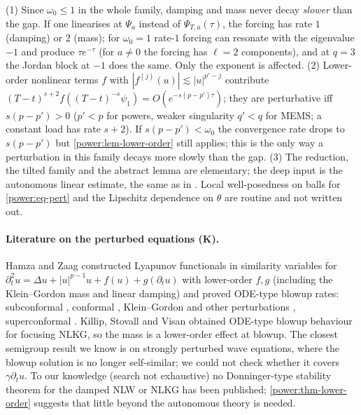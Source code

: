 \begin{remark}\label{power:rem-rates}
(1) Since $\omega_0\le1$ in the whole family, damping and mass never decay
\emph{slower} than the gap. If one linearises at $\Psi_a$ instead of
$\Psi_{T,a}(\tau)$, the forcing has rate $1$ (damping) or $2$ (mass); for
$\omega_0=1$ rate-$1$ forcing can resonate with the eigenvalue $-1$ and produce
$\tau e^{-\tau}$ (for $a\neq0$ the forcing has $\ell=2$ components), and at $q=3$ the
Jordan block at $-1$ does the same. Only the exponent is affected.
(2) Lower-order nonlinear terms $f$ with $|f^{(j)}(u)|\lesssim|u|^{p'-j}$ contribute
$(T-t)^{s+2}f((T-t)^{-s}\psi_1)=O(e^{-s(p-p')\tau})$; they are perturbative iff
$s(p-p')>0$ ($p'<p$ for powers, weaker singularity $q'<q$ for MEMS; a constant
load has rate $s+2$). If $s(p-p')<\omega_0$ the convergence rate drops to
$s(p-p')$ but \cref{power:lem-lower-order} still applies; this is the only way
a perturbation in this family decays more slowly than the gap.
(3) The reduction, the tilted family and the abstract lemma are elementary;
the deep input is the autonomous linear estimate, the same as in
\cite{Ostermann2024}. Local well-posedness on balls for \eqref{power:eq-pert} and the
Lipschitz dependence on $\theta$ are routine and not written out.
\end{remark}

\paragraph{Literature on the perturbed equations \textbf{(K)}.}
Hamza and Zaag constructed Lyapunov functionals in similarity variables for
$\partial_t^2u=\Delta u+|u|^{p-1}u+f(u)+g(\partial_tu)$ with lower-order $f,g$ (including
the Klein--Gordon mass and linear damping) and proved ODE-type blowup rates:
subconformal \cite{HamzaZaag2010}, conformal \cite{HamzaZaag2012}, Klein--Gordon
and other perturbations \cite{HamzaZaag2013}, superconformal
\cite{HamzaZaag2013b}. Killip, Stovall and Visan \cite{KillipStovallVisan2014}
obtained ODE-type blowup behaviour for focusing NLKG, so the mass is a
lower-order effect at blowup. The closest semigroup result we know is
\cite{DonningerWallauch2021} on strongly perturbed wave equations, where the
blowup solution is no longer self-similar; we could not check whether it covers
$\gamma\partial_tu$. To our knowledge (search not exhaustive) no Donninger-type
stability theorem for the damped NLW or NLKG has been published;
\cref{power:thm-lower-order} suggests that little beyond the autonomous theory
is needed.

